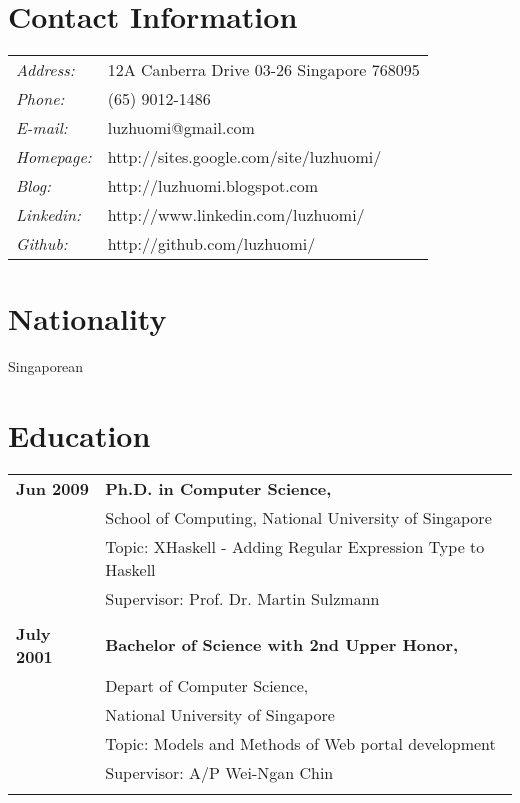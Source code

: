 \documentclass[margin,line]{res}
\begin{document}


\begin{resume}
\section{\sc Contact Information}
\vspace{.05in}
\begin{tabular}{@{}p{1in}p{4in}}
{\it Address:} & 12A Canberra Drive 03-26 Singapore 768095 \\
{\it Phone:} &  (65) 9012-1486 \\            
{\it E-mail:} &  luzhuomi@gmail.com \\         
{\it Homepage:} & http://sites.google.com/site/luzhuomi/\\     
{\it Blog:} & http://luzhuomi.blogspot.com \\
{\it Linkedin:} & http://www.linkedin.com/luzhuomi/  \\
{\it Github:} & http://github.com/luzhuomi/
\end{tabular}

\section{\sc Nationality}
Singaporean


\section{\sc Education} 
\begin{tabular}{ll}
 {\bf Jun 2009}  & {\bf Ph.D. in Computer Science, } \\ 
		       & School of Computing, National University of Singapore \\ 
		       & Topic: XHaskell - Adding Regular Expression Type to Haskell \\ 
		       & Supervisor: Prof. Dr. Martin Sulzmann \\ \\
 {\bf July 2001} & {\bf Bachelor of Science with 2nd Upper Honor,} \\ 
		       & Depart of Computer Science, \\
		       & National University of Singapore \\ 
		       & Topic: Models and Methods of Web portal development \\ 
		       & Supervisor: A/P Wei-Ngan Chin \\ \\
\end{tabular}




\end{resume}
\end{document}
